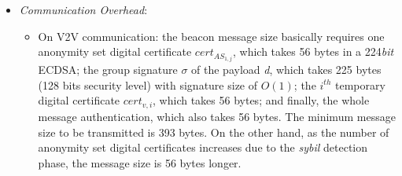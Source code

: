 \documentclass[preprint,12pt]{elsarticle}
\newcommand{\protocolname}{$ASAP$-V}
\begin{document}
\begin{itemize}
	\item \textit{Communication Overhead}:
	\begin{itemize}
		\item On V2V communication: the beacon message size basically requires one anonymity set digital certificate $cert_{AS_{1,j}}$, which takes 56 bytes in a 224\textit{bit} ECDSA; the group signature $\sigma$ of the payload \textit{d}, which takes 225 bytes (128 bits security level) with signature size of $O (1)$; the $i^{th}$ temporary digital certificate $cert_{v, i}$, which takes 56 bytes; and finally, the whole message authentication, which also takes 56 bytes. The minimum message size to be transmitted is 393 bytes. On the other hand, as the number of anonymity set digital certificates increases due to the \textit{sybil} detection phase, the message size is 56 bytes longer.
		
%		
				

\end{itemize}
\end{itemize}
\end{document}
